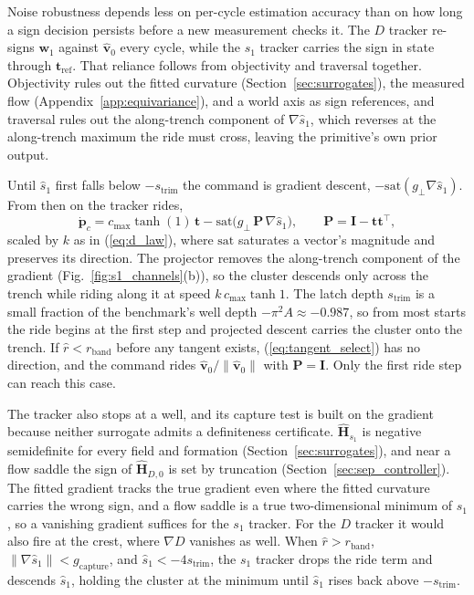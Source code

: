\documentclass[lettersize,journal]{IEEEtran}
\begin{document}
Noise robustness depends less on per-cycle estimation accuracy than on how
long a sign decision persists before a new measurement checks it. The $D$
tracker re-signs $\mathbf{w}_1$ against $\hat{\mathbf{v}}_0$ every cycle,
while the $s_1$ tracker carries the sign in state through
$\mathbf{t}_{\mathrm{ref}}$. That reliance follows from objectivity and
traversal together. Objectivity rules out the fitted curvature
(Section~\ref{sec:surrogates}), the measured flow
(Appendix~\ref{app:equivariance}), and a world axis as sign references, and
traversal rules out the along-trench component of $\nabla\hat{s}_1$, which
reverses at the along-trench maximum the ride must cross, leaving the
primitive's own prior output.

Until $\hat{s}_1$ first falls below $-s_{\mathrm{trim}}$ the command is
gradient descent, $-\mathrm{sat}(g_\perp\nabla\hat{s}_1)$. From then on
the tracker rides,
\begin{equation}
    \dot{\mathbf{p}}_c =
    c_{\max}\tanh(1)\,\mathbf{t}
    - \mathrm{sat}\!\bigl(g_\perp\,\mathbf{P}\,\nabla\hat{s}_1\bigr),
    \qquad
    \mathbf{P} = \mathbf{I} - \mathbf{t}\mathbf{t}^\top,
    \label{eq:s1_law}
\end{equation}
scaled by $k$ as in (\ref{eq:d_law}), where $\mathrm{sat}$ saturates a
vector's magnitude and preserves its direction. The projector removes
the along-trench component of the gradient
(Fig.~\ref{fig:s1_channels}(b)), so the cluster descends only across the
trench while riding along it at speed $k\,c_{\max}\tanh 1$. The latch
depth $s_{\mathrm{trim}}$ is a small fraction of the benchmark's well
depth $-\pi^2 A \approx -0.987$, so from most starts the ride begins at
the first step and projected descent carries the cluster onto the
trench. If $\hat{r} < r_{\mathrm{band}}$ before any tangent exists,
(\ref{eq:tangent_select}) has no direction, and the command rides
$\hat{\mathbf{v}}_0/\|\hat{\mathbf{v}}_0\|$ with $\mathbf{P} = \mathbf{I}$.
Only the first ride step can reach this case.

The tracker also stops at a well, and its capture test is built on the
gradient because neither surrogate admits a definiteness certificate.
$\hat{\mathbf{H}}_{s_1}$ is negative semidefinite for every field and
formation (Section~\ref{sec:surrogates}), and near a flow saddle the sign
of $\hat{\mathbf{H}}_{D,0}$ is set by truncation
(Section~\ref{sec:sep_controller}). The fitted gradient tracks the true
gradient even where the fitted curvature carries the wrong sign, and a flow
saddle is a true two-dimensional minimum of $s_1$, so a vanishing gradient
suffices for the $s_1$ tracker. For the $D$ tracker it would also fire at
the crest, where $\nabla D$ vanishes as well. When
$\hat{r} > r_{\mathrm{band}}$,
$\|\nabla\hat{s}_1\| < g_{\mathrm{capture}}$, and
$\hat{s}_1 < -4s_{\mathrm{trim}}$, the $s_1$ tracker drops the ride term and
descends $\hat{s}_1$, holding the cluster at the minimum until $\hat{s}_1$
rises back above $-s_{\mathrm{trim}}$.
\end{document}
